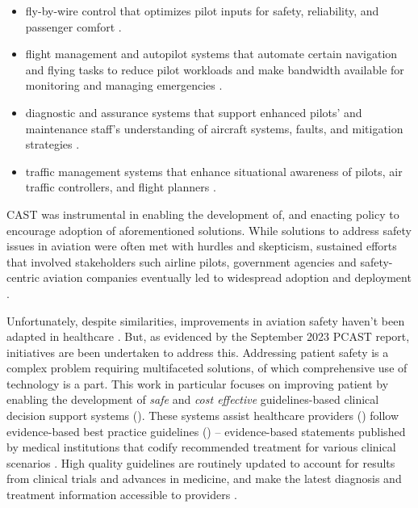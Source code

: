 \begin{itemize}
  \item fly-by-wire control that optimizes pilot inputs for safety, reliability,
    and passenger comfort \cite{FBWSkybraryUrl}.
  \item flight management and autopilot systems that automate certain navigation
    and flying tasks to reduce pilot workloads and make bandwidth available for monitoring and
    managing emergencies \cite{CockpitAutomationSkybraryURL}.
  \item diagnostic and assurance systems that support enhanced pilots' and
    maintenance staff's understanding of aircraft systems, faults, and
    mitigation strategies \cite{CockpitAutomationSkybraryURL}.
  \item traffic management systems that enhance situational awareness of
    pilots, air traffic controllers, and flight planners \cite{ATMSkybraryUrl,TCASUrl}.
\end{itemize}
CAST was instrumental in enabling the development of, and enacting policy to
encourage adoption of aforementioned solutions.
While solutions to address safety issues in aviation were often met with
hurdles and skepticism, sustained efforts that involved stakeholders such
airline pilots, government agencies and safety-centric aviation companies
eventually led to widespread adoption and deployment \cite{CASTSafetySkybrary}.

Unfortunately, despite similarities, improvements in aviation safety haven't
been adapted in healthcare \cite{GerstleJPS18}.
But, as evidenced by the September 2023 PCAST report, initiatives are been
undertaken to address this. Addressing patient safety is a complex problem
requiring multifaceted solutions, of which comprehensive use of technology is a part.
This work in particular focuses on improving patient by enabling
the development of \emph{safe} and \emph{cost effective} guidelines-based clinical decision
support systems (\CDSSs{}). These systems assist healthcare providers (\HCPs{}) follow
evidence-based best practice guidelines (\BPGs{}) -- evidence-based
statements published by medical institutions that codify recommended treatment
for various clinical scenarios \cite{FieldClinical90}. High quality guidelines are routinely updated to account for
 results from clinical trials and advances in medicine, and make the latest
 diagnosis and treatment information accessible to providers \cite{SteinbergNAP11}.

